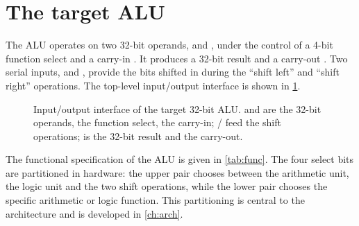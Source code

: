 \section{The target ALU}
The ALU operates on two 32-bit operands,  and , under the
control of a 4-bit function select \sel{} and a carry-in . It
produces a 32-bit result  and a carry-out . Two serial
inputs,  and , provide the bits shifted in during
the ``shift left'' and ``shift right'' operations. The top-level
input/output interface is shown in \cref{fig:io}.

\begin{figure}[htbp]
\centering
{}
\caption{Input/output interface of the target 32-bit ALU.  and
 are the 32-bit operands, \sel{} the function select,  the
carry-in; / feed the shift operations;  is
the 32-bit result and  the carry-out.}
\label{fig:io}
\end{figure}

The functional specification of the ALU is given in \cref{tab:func}. The
four select bits are partitioned in hardware: the upper pair
 chooses between the arithmetic unit, the logic unit and the
two shift operations, while the lower pair  chooses the
specific arithmetic or logic function. This partitioning is central to
the architecture and is developed in \cref{ch:arch}.

